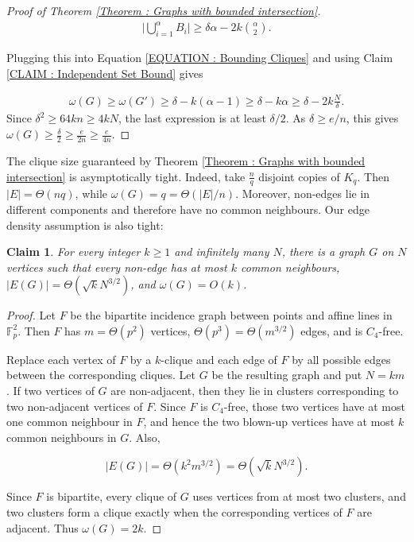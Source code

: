 \documentclass[fullpage,11pt]{article}
\theoremstyle{break}
\newtheorem{claim}[theorem]{Claim}
\theoremstyle{definition}
\theoremstyle{break}
\begin{document}
\begin{proof}[Proof of Theorem \ref{Theorem : Graphs with bounded intersection}]
    \begin{align*}
        \bigg| \bigcup_{i=1}^{\alpha} B_i \bigg|
        \geq
        \delta\alpha-2k{\alpha \choose 2}.
    \end{align*}

    \noindent Plugging this into Equation \ref{EQUATION : Bounding Cliques} and using Claim \ref{CLAIM : Independent Set Bound} gives

    \begin{align*}
        \omega(G)\geq\omega(G') \geq \delta-k(\alpha-1) \geq \delta-k\alpha \geq \delta - 2k\frac{N}{\delta}.
    \end{align*}
    Since $\delta^2\geq64kn\geq4kN$, the last expression is at least $\delta/2$. As $\delta\geq e/n$, this gives $\omega(G)\geq\frac{\delta}{2}\geq\frac{e}{2n}\geq\frac{e}{4n}$.
\end{proof}

The clique size guaranteed by Theorem \ref{Theorem : Graphs with bounded intersection} is asymptotically tight. Indeed, take $\frac{n}{q}$ disjoint copies of $K_q$. Then $|E|=\Theta(nq)$, while $\omega(G)=q=\Theta(|E|/n)$. Moreover, non-edges lie in different components and therefore have no common neighbours.
Our edge density assumption is also tight:
\begin{claim}\label{Claim : Projective Plane Graph}
    For every integer $k\geq1$ and infinitely many $N$, there is a graph $G$ on $N$ vertices such that every non-edge has at most $k$ common neighbours, $|E(G)|=\Theta\left(\sqrt{k}N^{3/2}\right)$, and $\omega(G)=O(k)$.
\end{claim}

\begin{proof}
    Let $F$ be the bipartite incidence graph between points and affine lines in $\mathbb{F}_p^2$. Then $F$ has $m=\Theta(p^2)$ vertices, $\Theta(p^3)=\Theta(m^{3/2})$ edges, and is $C_4$-free.

    Replace each vertex of $F$ by a $k$-clique and each edge of $F$ by all possible edges between the corresponding cliques. Let $G$ be the resulting graph and put $N=km$. If two vertices of $G$ are non-adjacent, then they lie in clusters corresponding to two non-adjacent vertices of $F$. Since $F$ is $C_4$-free, those two vertices have at most one common neighbour in $F$, and hence the two blown-up vertices have at most $k$ common neighbours in $G$. Also,

    \[
        |E(G)|=\Theta(k^2m^{3/2})=\Theta(\sqrt{k}N^{3/2}).
    \]

    Since $F$ is bipartite, every clique of $G$ uses vertices from at most two clusters, and two clusters form a clique exactly when the corresponding vertices of $F$ are adjacent. Thus $\omega(G)=2k$.
\end{proof}
\end{document}
